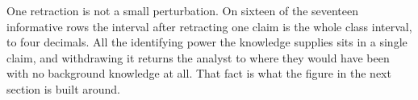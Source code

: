 One retraction is not a small perturbation. On sixteen of the seventeen informative rows the
interval after retracting one claim is the whole class interval, to four decimals. All the
identifying power the knowledge supplies sits in a single claim, and withdrawing it returns the
analyst to where they would have been with no background knowledge at all. That fact is what the
figure in the next section is built around.
